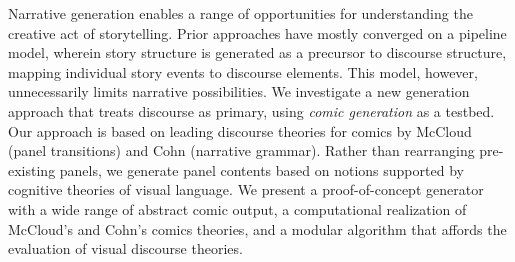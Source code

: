 Narrative generation enables a range of opportunities for understanding 
the creative act of storytelling.
Prior approaches have mostly converged on a pipeline model, wherein story
structure is generated as a precursor to discourse structure, mapping
individual story events to discourse elements. 
This model, however, unnecessarily limits narrative possibilities. %
%
We investigate a new generation approach that treats discourse as
primary, using {\em comic generation} as a testbed.  Our approach is based
on leading discourse theories for comics by McCloud (panel transitions) and
Cohn (narrative grammar). Rather than rearranging pre-existing panels, we
generate panel contents based on notions
supported by cognitive theories of visual language.
We present a proof-of-concept generator with a wide range of abstract comic
output, a computational realization of McCloud's and Cohn's comics
theories, and a modular algorithm that affords the evaluation of visual
discourse theories.


